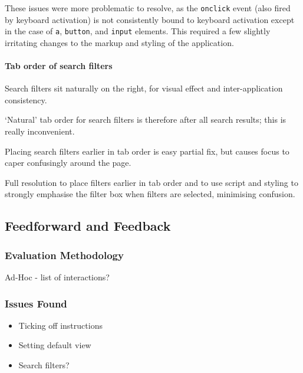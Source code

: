 These issues were more problematic to resolve, as the \verb!onclick!
  event (also fired by keyboard activation) is not consistently bound
  to keyboard activation except in the case of \verb!a!,
  \verb!button!, and \verb!input! elements. This required a few
  slightly irritating changes to the markup and styling of the
  application.

\paragraph{Tab order of search filters}

Search filters sit naturally on the right, for visual effect and
inter-application consistency.

`Natural' tab order for search filters is therefore after all search
results; this is really inconvenient.

Placing search filters earlier in tab order is easy partial fix, but
causes focus to caper confusingly around the page.

Full resolution to place filters earlier in tab order and to use
script and styling to strongly emphasise the filter box when filters
are selected, minimising confusion.

\subsection{Feedforward and Feedback}

\subsubsection{Evaluation Methodology}

Ad-Hoc - list of interactions?

\subsubsection{Issues Found}

\begin{itemize}
\item Ticking off instructions
\item Setting default view
\item Search filters?
\end{itemize}

